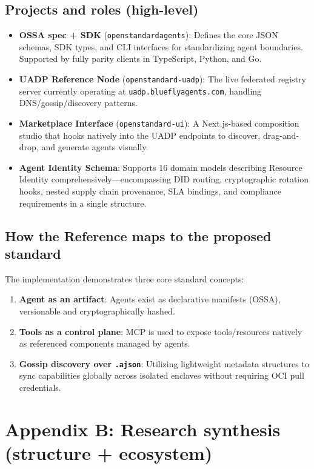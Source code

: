 \documentclass[11pt]{article}
\begin{document}
\subsection{Projects and roles (high-level)}
\begin{itemize}
  \item \textbf{OSSA spec + SDK} (\texttt{openstandardagents}): Defines the core JSON schemas, SDK types, and CLI interfaces for standardizing agent boundaries. Supported by fully parity clients in TypeScript, Python, and Go.
  \item \textbf{UADP Reference Node} (\texttt{openstandard-uadp}): The live federated registry server currently operating at \texttt{uadp.blueflyagents.com}, handling DNS/gossip/discovery patterns.
  \item \textbf{Marketplace Interface} (\texttt{openstandard-ui}): A Next.js-based composition studio that hooks natively into the UADP endpoints to discover, drag-and-drop, and generate agents visually.
  \item \textbf{Agent Identity Schema}: Supports 16 domain models describing Resource Identity comprehensively—encompassing DID routing, cryptographic rotation hooks, nested supply chain provenance, SLA bindings, and compliance requirements in a single structure.
\end{itemize}

\subsection{How the Reference maps to the proposed standard}
The implementation demonstrates three core standard concepts:
\begin{enumerate}
  \item \textbf{Agent as an artifact}: Agents exist as declarative manifests (OSSA), versionable and cryptographically hashed.
  \item \textbf{Tools as a control plane}: MCP is used to expose tools/resources natively as referenced components managed by agents.
  \item \textbf{Gossip discovery over \texttt{.ajson}}: Utilizing lightweight metadata structures to sync capabilities globally across isolated enclaves without requiring OCI pull credentials.
\end{enumerate}

\section{Appendix B: Research synthesis (structure + ecosystem)}
\end{document}
